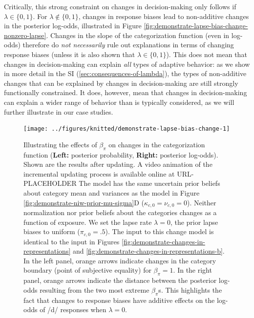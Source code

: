 \documentclass[
  11pt,
  man,floatsintext]{apa6}
\begin{document}
Critically, this strong constraint on changes in decision-making only follows if \(\lambda \in \{0,1\}\). For \(\lambda \not\in \{0,1\}\), changes in response biases lead to non-additive changes in the posterior log-odds, illustrated in Figure \ref{fig:demonstrate-lapse-bias-change-nonzero-lapse}. Changes in the slope of the categorization function (even in log-odds) therefore do \emph{not necessarily} rule out explanations in terms of changing response biases (unless it is also shown that \(\lambda \in \{0,1\}\)). This does not mean that changes in decision-making can explain \emph{all} types of adaptive behavior: as we show in more detail in the SI (\ref{sec:consequences-of-lambda}), the types of non-additive changes that can be explained by changes in decision-making are still strongly functionally constrained. It does, however, mean that changes in decision-making can explain a wider range of behavior than is typically considered, as we will further illustrate in our case studies.



\begin{figure}

{\centering \texttt{[image: ../figures/knitted/demonstrate-lapse-bias-change-1]} 

}

\caption{Illustrating the effects of \(\beta_{\pi}\) on changes in the categorization function (\textbf{Left:} posterior probability, \textbf{Right:} posterior log-odds). Shown are the results after updating. A video animation of the incremental updating process is available online at URL-PLACEHOLDER The model has the same uncertain prior beliefs about category mean and variances as the model in Figure \ref{fig:demonstrate-niw-prior-mu-sigma}D (\(\kappa_{c,0} = \nu_{c,0}=0\)). Neither normalization nor prior beliefs about the categories changes as a function of exposure. We set the lapse rate \(\lambda = 0\), the prior lapse biases to uniform (\(\pi_{c,0}=.5\)). The input to this change model is identical to the input in Figures \ref{fig:demonstrate-changes-in-representations} and \ref{fig:demonstrate-changes-in-representations-b}. In the left panel, orange arrows indicate changes in the category boundary (point of subjective equality) for \(\beta_{\pi} = 1\). In the right panel, orange arrows indicate the distance between the posterior log-odds resulting from the two most extreme \(\beta_{\pi}\)s. This highlights the fact that changes to response biases have additive effects on the log-odds of /d/ responses when \(\lambda = 0\).}\label{fig:demonstrate-lapse-bias-change}
\end{figure}
\end{document}

